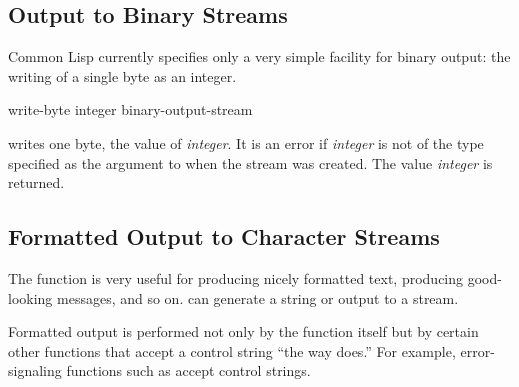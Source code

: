 \subsection {Output to Binary Streams}

Common Lisp currently specifies only a very simple facility for binary output:
the writing of a single byte as an integer.

\begin{defun}[Function]
write-byte integer binary-output-stream

 writes one byte, the value of \emph{integer}.
It is an error if \emph{integer} is not of the type
specified as the  argument to  when the stream
was created.
The value \emph{integer} is returned.
\end{defun}


\subsection{Formatted Output to Character Streams}
\label{FORMAT-SECTION}

The function  is very useful for producing
nicely formatted text, producing good-looking messages, and so on.
 can generate a string or output to a stream.

Formatted output is performed not only by the  function
itself but by certain other functions that accept a control string
``the way  does.''  For example, error-signaling functions
such as  accept  control strings.

